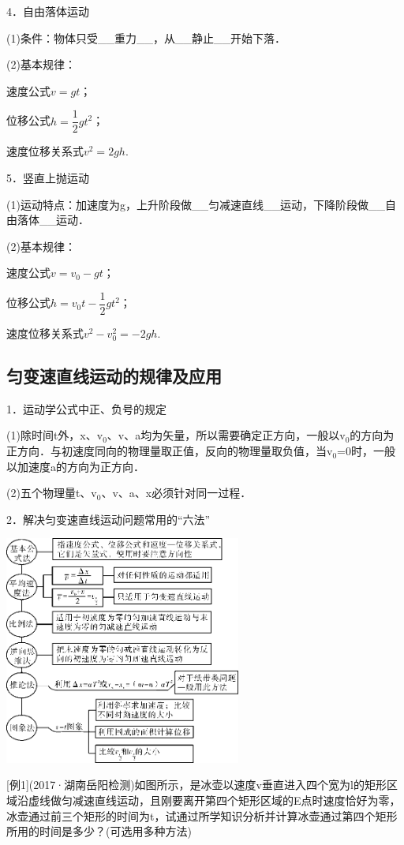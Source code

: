 \documentclass[cn,10.5pt,chinese,mac,chinesefont=founder]{elegantbook}
\begin{document}
4．自由落体运动

(1)条件：物体只受\_\_重力\_\_，从\_\_静止\_\_开始下落．

(2)基本规律：

速度公式$v=g t$；

位移公式$h=\dfrac{1}{2} g t^{2}$；

速度位移关系式$v^{2}=2 g h$.

5．竖直上抛运动

(1)运动特点：加速度为g，上升阶段做\_\_匀减速直线\_\_运动，下降阶段做\_\_自由落体\_\_运动．

(2)基本规律：

速度公式$v=v_{0}-g t$；

位移公式$h=v_{0} t-\dfrac{1}{2} g t^{2}$；

速度位移关系式$v^{2}-v_{0}^{2}=-2 g h$.
\newpage
\subsection{匀变速直线运动的规律及应用}

1．运动学公式中正、负号的规定

(1)除时间t外，x、$\mathrm v_0$、v、a均为矢量，所以需要确定正方向，一般以$\mathrm v_0$的方向为正方向．与初速度同向的物理量取正值，反向的物理量取负值，当$\mathrm v_0$=0时，一般以加速度a的方向为正方向．

(2)五个物理量t、$\mathrm v_0$、v、a、x必须针对同一过程．

2．解决匀变速直线运动问题常用的``六法''

\begin{center}\includegraphics[width=3.06458in,height=2.96319in]{media/image23.png}\end{center}

{[}例1{]}(2017·湖南岳阳检测)如图所示，是冰壶以速度v垂直进入四个宽为l的矩形区域沿虚线做匀减速直线运动，且刚要离开第四个矩形区域的E点时速度恰好为零，冰壶通过前三个矩形的时间为t，试通过所学知识分析并计算冰壶通过第四个矩形所用的时间是多少？(可选用多种方法)
\end{document}
